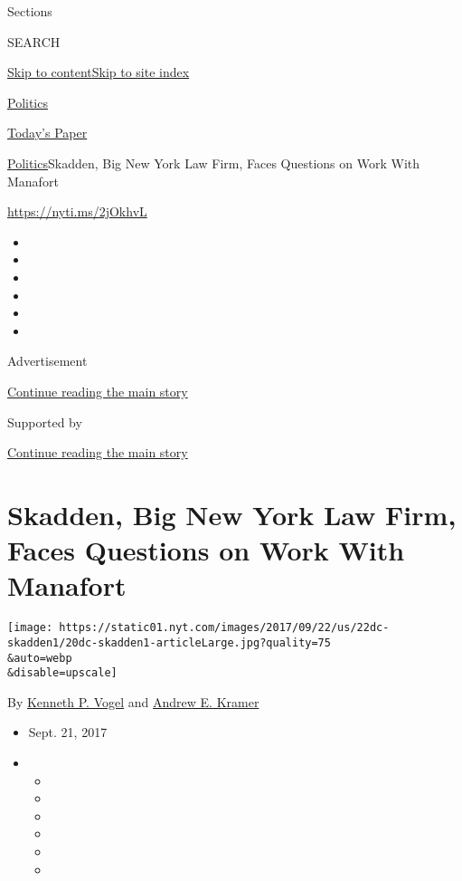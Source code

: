 Sections

SEARCH

\protect\hyperlink{site-content}{Skip to
content}\protect\hyperlink{site-index}{Skip to site index}

\href{https://www.nytimes.com/section/politics}{Politics}

\href{https://myaccount.nytimes.com/auth/login?response_type=cookie\&client_id=vi}{}

\href{https://www.nytimes.com/section/todayspaper}{Today's Paper}

\href{/section/politics}{Politics}\textbar{}Skadden, Big New York Law
Firm, Faces Questions on Work With Manafort

\url{https://nyti.ms/2jOkhvL}

\begin{itemize}
\item
\item
\item
\item
\item
\item
\end{itemize}

Advertisement

\protect\hyperlink{after-top}{Continue reading the main story}

Supported by

\protect\hyperlink{after-sponsor}{Continue reading the main story}

\hypertarget{skadden-big-new-york-law-firm-faces-questions-on-work-with-manafort}{%
\section{Skadden, Big New York Law Firm, Faces Questions on Work With
Manafort}\label{skadden-big-new-york-law-firm-faces-questions-on-work-with-manafort}}

\texttt{[image: https://static01.nyt.com/images/2017/09/22/us/22dc-skadden1/20dc-skadden1-articleLarge.jpg?quality=75\\\&auto=webp\\\&disable=upscale]}

By \href{https://www.nytimes.com/by/kenneth-p-vogel}{Kenneth P. Vogel}
and \href{http://www.nytimes.com/by/andrew-e-kramer}{Andrew E. Kramer}

\begin{itemize}
\item
  Sept. 21, 2017
\item
  \begin{itemize}
  \item
  \item
  \item
  \item
  \item
  \item
  \end{itemize}
\end{itemize}

